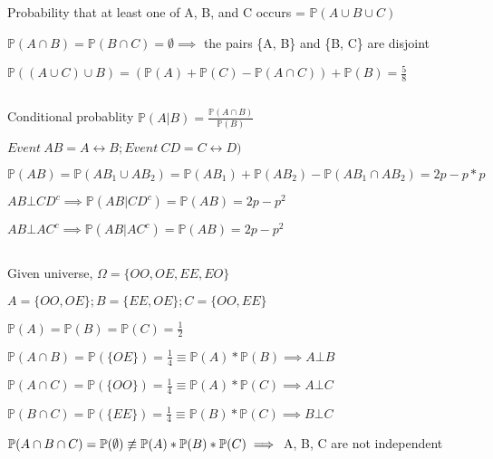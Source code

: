 \documentclass{article}
\begin{document}
\subsection{}
Probability that at least one of A, B, and C occurs = \( \mathbb{P}(A \cup B \cup C) \)

\( \mathbb{P}(A \cap B) = \mathbb{P}(B \cap C) = \emptyset \implies \) the pairs \{A, B\} and \{B, C\} are disjoint

\( \mathbb{P}((A \cup C) \cup B) = (\mathbb{P}(A) + \mathbb{P}(C) - \mathbb{P}(A \cap C)) + \mathbb{P}(B) = \frac{5}{8} \)

\subsection{}
Conditional probablity \( \mathbb{P}(A|B) = \frac{\mathbb{P}(A \cap B)}{\mathbb{P}(B)} \)

\( Event~AB = A \leftrightarrow B; Event~CD = C \leftrightarrow D) \)

\( \mathbb{P}(AB) = \mathbb{P}(AB_1 \cup AB_2) = \mathbb{P}(AB_1) + \mathbb{P}(AB_2) - \mathbb{P}(AB_1 \cap AB_2) = 2p - p*p \)

\( AB \bot CD^c \implies \mathbb{P}(AB | CD^c) = \mathbb{P}(AB) = 2p - p^2 \)

\( AB \bot AC^c \implies \mathbb{P}(AB | AC^c) = \mathbb{P}(AB) = 2p - p^2 \)

\subsection{}
Given universe, \( \Omega = \{OO, OE, EE, EO\} \)

\( A = \{OO, OE\}; B = \{EE, OE\}; C = \{OO, EE\} \)

\( \mathbb{P}(A) = \mathbb{P}(B) = \mathbb{P}(C) = \frac{1}{2} \)

\( \mathbb{P}(A \cap B) = \mathbb{P}(\{OE\}) = \frac{1}{4} \equiv \mathbb{P}(A)*\mathbb{P}(B) \implies A \bot B \)

\( \mathbb{P}(A \cap C) = \mathbb{P}(\{OO\}) = \frac{1}{4} \equiv \mathbb{P}(A)*\mathbb{P}(C) \implies A \bot C \)

\( \mathbb{P}(B \cap C) = \mathbb{P}(\{EE\}) = \frac{1}{4} \equiv \mathbb{P}(B)*\mathbb{P}(C) \implies B \bot C \)

\( \mathbb{P}(A \cap B \cap C) = \mathbb{P}({\emptyset}) \centernot\equiv \mathbb{P}(A)*\mathbb{P}(B)*\mathbb{P}(C) \implies \) A, B, C are not independent

\subsection{}
\end{document}
